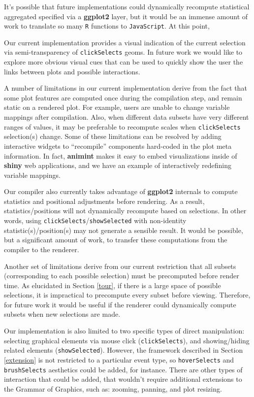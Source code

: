 \documentclass[12pt,]{article}
\theoremstyle{definition}
\theoremstyle{definition}
\theoremstyle{definition}
\theoremstyle{remark}
\begin{document}
It's possible that future implementations could dynamically recompute
statistical aggregated specified via a \textbf{ggplot2} layer, but it
would be an immense amount of work to translate so many \texttt{R}
functions to \texttt{JavaScript}. At this point,

Our current implementation provides a visual indication of the current
selection via semi-transparency of \texttt{clickSelects} geoms. In
future work we would like to explore more obvious visual cues that can
be used to quickly show the user the links between plots and possible
interactions.

A number of limitations in our current implementation derive from the
fact that some plot features are computed once during the compilation
step, and remain static on a rendered plot. For example, users are
unable to change variable mappings after compilation. Also, when
different data subsets have very different ranges of values, it may be
preferable to recompute scales when \texttt{clickSelects} selection(s)
change. Some of these limitations can be resolved by adding interactive
widgets to ``recompile'' components hard-coded in the plot meta
information. In fact, \textbf{animint} makes it easy to embed
visualizations inside of \textbf{shiny} web applications, and we have an
example of interactively redefining variable mappings.

Our compiler also currently takes advantage of \textbf{ggplot2}
internals to compute statistics and positional adjustments before
rendering. As a result, statistics/positions will not dynamically
recompute based on selections. In other words, using
\texttt{clickSelects}/\texttt{showSelected} with non-identity
statistic(s)/position(s) may not generate a sensible result. It would be
possible, but a significant amount of work, to transfer these
computations from the compiler to the renderer.

Another set of limitations derive from our current restriction that all
subsets (corresponding to each possible selection) must be precomputed
before render time. As elucidated in Section \ref{tour}, if there is a
large space of possible selections, it is impractical to precompute
every subset before viewing. Therefore, for future work it would be
useful if the renderer could dynamically compute subsets when new
selections are made.

Our implementation is also limited to two specific types of direct
manipulation: selecting graphical elements via mouse click
(\texttt{clickSelects}), and showing/hiding related elements
(\texttt{showSelected}). However, the framework described in Section
\ref{extension} is not restricted to a particular event type, so
\texttt{hoverSelects} and \texttt{brushSelects} aesthetics could be
added, for instance. There are other types of interaction that could be
added, that wouldn't require additional extensions to the Grammar of
Graphics, such as: zooming, panning, and plot resizing.
\end{document}
